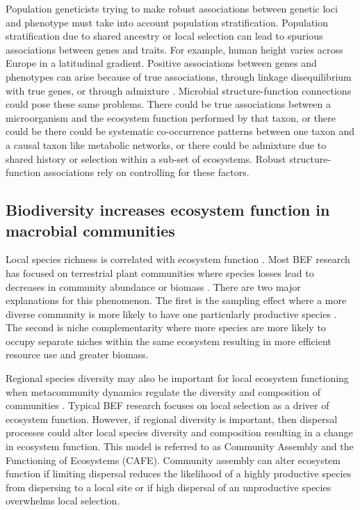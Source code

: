 \documentclass{article}
\begin{document}
Population geneticists trying to make robust associations between genetic loci
and phenotype must take into account population stratification. Population
stratification due to shared ancestry or local selection can lead to spurious
associations between genes and traits. For example, human height varies
across Europe in a latitudinal gradient. Positive associations between genes and
phenotypes can arise because of true associations, through linkage
disequilibrium with true genes, or through admixture \citep{lander1994}.
Microbial structure-function connections could pose these same problems. There
could be true associations between a microorganism and the ecosystem function
performed by that taxon, or there could be there could be systematic
co-occurrence patterns between one taxon and a causal taxon like metabolic
networks, or there could be admixture due to shared history or selection within
a sub-set of ecosystems. Robust structure-function associations rely on
controlling for these factors.

\subsection{Biodiversity increases ecosystem function in macrobial communities}

Local species richness is correlated with ecosystem function
\citep{hooper2005}. Most BEF research has focused on terrestrial plant 
communities where species losses lead to decreases in community abundance or biomass
\citep{naeem2003}. There are
two major explanations for this phenomenon. The first is the sampling effect
where a more diverse community is more likely to have one particularly
productive species \citep{cardinale2006}. The second is niche complementarity where more species are
more likely to occupy separate niches within the same ecosystem resulting in
more efficient resource use and greater biomass.

Regional species diversity may also be important for
local ecosystem functioning when metacommunity dynamics regulate the
diversity and composition of communities \citep{leibold2017}. 
Typical BEF research focuses on local selection
as a driver of ecosystem function. However, if regional
diversity is important, then dispersal processes could alter local species diversity and composition resulting in
a change in ecosystem function. This model is referred to as Community Assembly
and the Functioning of Ecosystems (CAFE). Community assembly can alter ecosystem
function if limiting dispersal reduces the likelihood of a highly productive
species from dispersing to a local site or if high dispersal of an unproductive
species overwhelms local selection.
\end{document}
